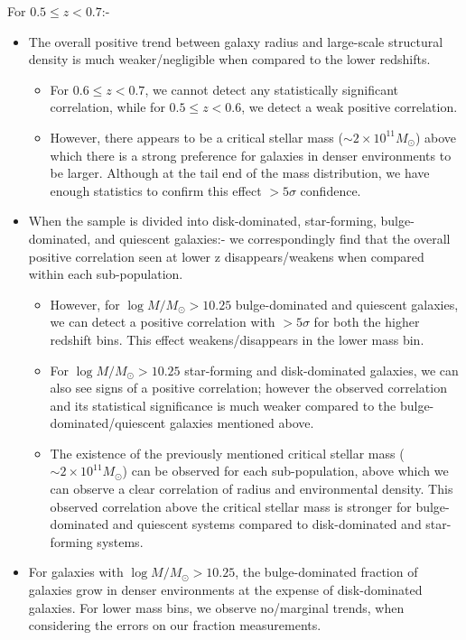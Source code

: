 For $0.5 \leq z < 0.7$:-
\begin{itemize}
    \item The overall positive trend between galaxy radius and large-scale structural density is much weaker/negligible when compared to the lower redshifts. 
    \begin{itemize}
        \item For $0.6 \leq z < 0.7$, we cannot detect any statistically significant correlation, while for $0.5 \leq z < 0.6$, we detect a weak positive correlation. 
        \item However, there appears to be a critical stellar mass ($\sim2\times10^{11} M_\odot$) above which there is a strong preference for galaxies in denser environments to be larger. Although at the tail end of the mass distribution, we have enough statistics to confirm this effect $>5\sigma$ confidence. 
    \end{itemize}
    \item When the sample is divided into disk-dominated, star-forming, bulge-dominated, and quiescent galaxies:- we correspondingly find that the overall positive correlation seen at lower z disappears/weakens when compared within each sub-population.
    \begin{itemize}
        \item However, for $\log M/M_{\odot} > 10.25$ bulge-dominated and quiescent galaxies, we can detect a positive correlation with $>5\sigma$ for both the higher redshift bins. This effect weakens/disappears in the lower mass bin. 
        \item For $\log M/M_{\odot} > 10.25$ star-forming and disk-dominated galaxies, we can also see signs of a positive correlation; however the observed correlation and its statistical significance is much weaker compared to the bulge-dominated/quiescent galaxies mentioned above. 
        \item The existence of the previously mentioned critical stellar mass ($\sim2\times10^{11} M_\odot$) can be observed for each sub-population, above which we can observe a clear correlation of radius and environmental density. This observed correlation above the critical stellar mass is stronger for bulge-dominated and quiescent systems compared to disk-dominated and star-forming systems. 
    \end{itemize}
    \item For galaxies with $\log M/M_\odot > 10.25$,  the bulge-dominated fraction of galaxies grow in denser environments at the expense of disk-dominated galaxies. For lower mass bins, we observe no/marginal trends, when considering the errors on our fraction measurements.
\end{itemize}

